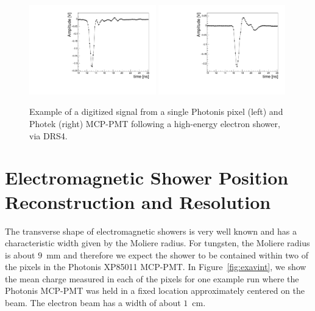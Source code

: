 \begin{figure}[htbp]
  \centering
  \includegraphics[width=0.49\textwidth]{Images/expulse/pulsepix_30_2_12.pdf}
  \includegraphics[width=0.49\textwidth]{Images/expulse/pulseref_30_2_10.pdf}
  \caption{\small Example of a digitized signal from a single Photonis pixel
(left) and Photek (right) MCP-PMT following a high-energy electron shower, via DRS4.}
  \label{fig:expulse}
\end{figure}


\section{ Electromagnetic Shower Position Reconstruction and Resolution}
\label{sec:position} The transverse shape of electromagnetic showers is very
well known and has a characteristic width given by the Moliere radius. For
tungsten, the Moliere radius is about $9$~mm and therefore we expect the shower
to be contained within two of the pixels in the Photonis XP85011 MCP-PMT. In
Figure~\ref{fig:exavint}, we show the mean charge measured in each of the pixels
for one example run where the Photonis MCP-PMT was held in a fixed location
approximately centered on the beam. The electron beam has a width of about
$1$~cm. 

